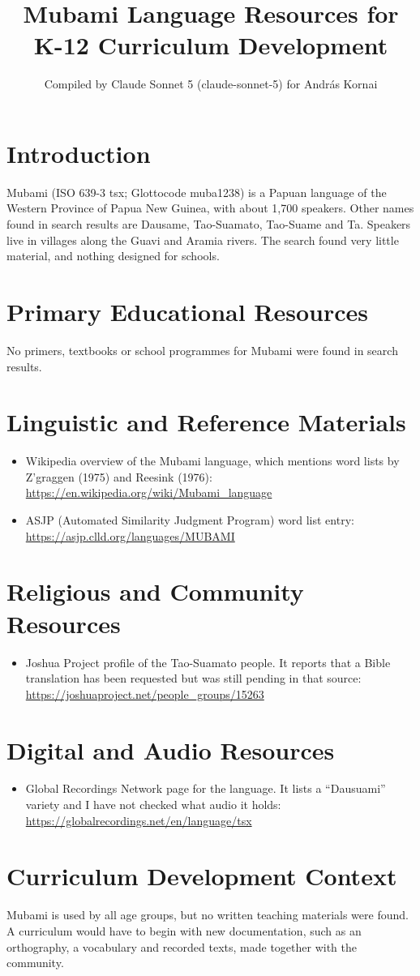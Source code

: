 \documentclass[12pt]{article}
\title{Mubami Language Resources for K-12 Curriculum Development}
\author{Compiled by Claude Sonnet 5 (claude-sonnet-5) for Andr\'as Kornai}
\date{}
\begin{document}
\maketitle

\section{Introduction}
Mubami (ISO 639-3 tsx; Glottocode muba1238) is a Papuan language of the Western Province of Papua New Guinea, with about 1,700 speakers. Other names found in search results are Dausame, Tao-Suamato, Tao-Suame and Ta. Speakers live in villages along the Guavi and Aramia rivers. The search found very little material, and nothing designed for schools.

\section{Primary Educational Resources}
No primers, textbooks or school programmes for Mubami were found in search results.

\section{Linguistic and Reference Materials}
\begin{itemize}
\item Wikipedia overview of the Mubami language, which mentions word lists by Z'graggen (1975) and Reesink (1976): \url{https://en.wikipedia.org/wiki/Mubami_language}
\item ASJP (Automated Similarity Judgment Program) word list entry: \url{https://asjp.clld.org/languages/MUBAMI}
\end{itemize}

\section{Religious and Community Resources}
\begin{itemize}
\item Joshua Project profile of the Tao-Suamato people. It reports that a Bible translation has been requested but was still pending in that source: \url{https://joshuaproject.net/people_groups/15263}
\end{itemize}

\section{Digital and Audio Resources}
\begin{itemize}
\item Global Recordings Network page for the language. It lists a ``Dausuami'' variety and I have not checked what audio it holds: \url{https://globalrecordings.net/en/language/tsx}
\end{itemize}

\section{Curriculum Development Context}
Mubami is used by all age groups, but no written teaching materials were found. A curriculum would have to begin with new documentation, such as an orthography, a vocabulary and recorded texts, made together with the community.
\end{document}

